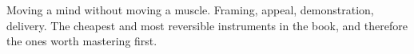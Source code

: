 
\begin{partblurb}
Moving a mind without moving a muscle. Framing, appeal, demonstration, delivery. The cheapest and most reversible instruments in the book, and therefore the ones worth mastering first.
\end{partblurb}
